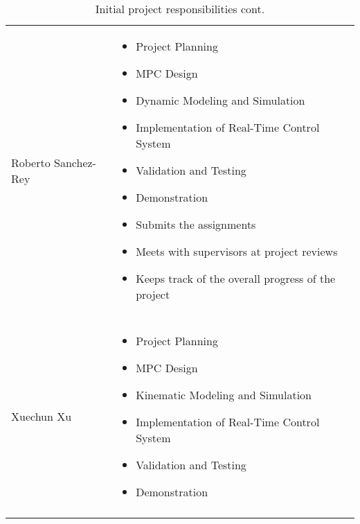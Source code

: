 \begin{table}[H]
    \begin{tabular}{l|l}
    Roberto Sanchez-Rey              &
      \begin{minipage}[t]{\textwidth}
        \begin{itemize}
          \item Project Planning
          \item MPC Design
          \item Dynamic Modeling and Simulation
          \item Implementation of Real-Time Control System
          \item Validation and Testing
          \item Demonstration
          \item Submits the assignments
          \item Meets with supervisors at project reviews
          \item Keeps track of the overall progress of the project
        \end{itemize}
      \end{minipage} \\ \\ \hline
    Xuechun Xu                       &
      \begin{minipage}[t]{\textwidth}
        \begin{itemize}
          \item Project Planning
          \item MPC Design
          \item Kinematic Modeling and Simulation
          \item Implementation of Real-Time Control System
          \item Validation and Testing
          \item Demonstration
        \end{itemize}
      \end{minipage} \\ \\ \hline
    \end{tabular}
    \caption{Initial project responsibilities cont.}
    \label{tbl:responsibilities_2}
\end{table}
